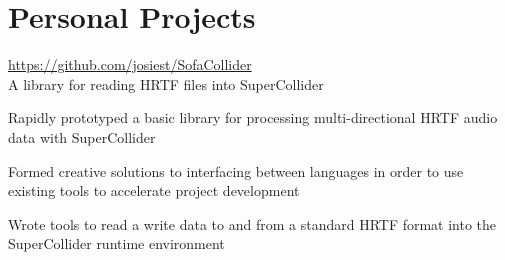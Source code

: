 \documentclass[10pt]{article}
\newenvironment{itemize*}
{\begin{itemize}[leftmargin=*]
    \setlength{\parskip}{0.5pt}}
{\end{itemize}}
\begin{document}
\section*{Personal Projects}

\begin{description}[leftmargin=!,
                    labelwidth=\widthof{\bfseries SofaCollider HRTF Library}]
\item[SofaCollider HRTF Library] \url{https://github.com/josiest/SofaCollider}\\
    A library for reading HRTF files into SuperCollider
    
\end{description}
\begin{itemize*}
\item Rapidly prototyped a basic library for processing multi-directional HRTF audio data with SuperCollider
\item Formed creative solutions to interfacing between languages in order to
    use existing tools to accelerate project development
\item Wrote tools to read a write data to and from a standard HRTF format into
    the SuperCollider runtime environment
\end{itemize*}


\end{document}
